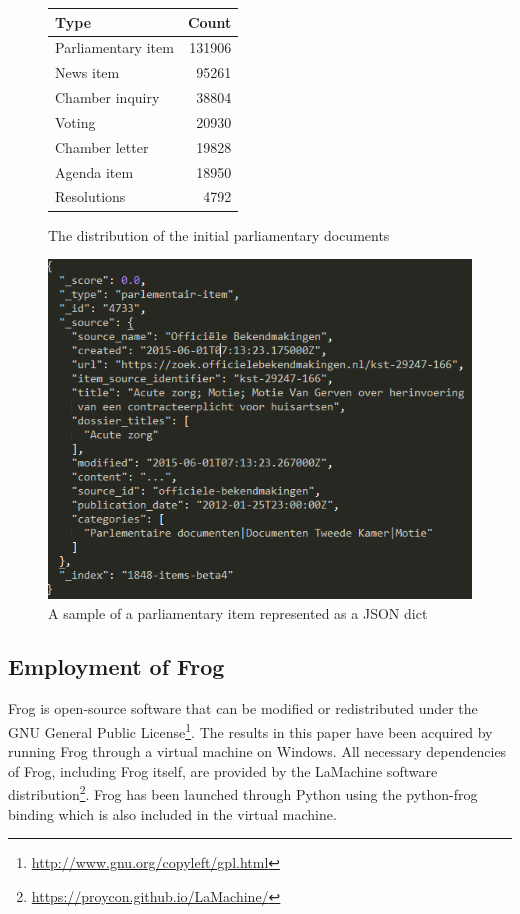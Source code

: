 \begin{figure} \label{fig:data_dis}
\centering
\begin{tabular}{l|r}
Type              & Count \\
\hline
Parliamentary item & 131906  \\
News item & 95261 \\
Chamber inquiry & 38804  \\
Voting & 20930 \\
Chamber letter & 19828 \\
Agenda item & 18950  \\
Resolutions & 4792 \\
\end{tabular}
\caption{The distribution of the initial parliamentary documents}
\end{figure}

\begin{figure}
    \centering
    \includegraphics[scale=0.8]{fig/data_format}
    \caption{A sample of a parliamentary item represented as a JSON dict}
    \label{fig:data_form}
\end{figure}

\subsection{Employment of Frog}\label{subsec:frog_emp}
Frog is open-source software that can be modified or redistributed under the GNU General Public License\footnote{\url{http://www.gnu.org/copyleft/gpl.html}}. The results in this paper have been acquired by running Frog through a virtual machine on Windows. All necessary dependencies of Frog, including Frog itself, are provided by the LaMachine software distribution\footnote{\url{https://proycon.github.io/LaMachine/}}. Frog has been launched through Python using the python-frog binding which is also included in the virtual machine.

